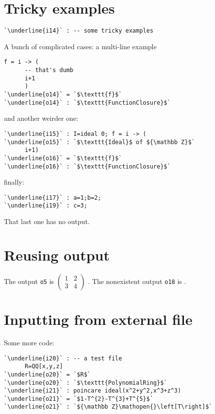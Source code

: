 \documentclass[12pt,a4paper]{amsart}
\begin{document}
\section{Tricky examples}
\begin{lstlisting}[language=Macaulay2]
`\underline{i14}` : -- some tricky examples\end{lstlisting}
A bunch of complicated cases: a multi-line example
\begin{lstlisting}[language=Macaulay2]
      f = i -> (
      -- that's dumb
      i+1
      )
`\underline{o14}` = `$\texttt{f}$`
`\underline{o14}` : `$\texttt{FunctionClosure}$`\end{lstlisting}
and another weirder one:
\begin{lstlisting}[language=Macaulay2]
`\underline{i15}` : I=ideal 0; f = i -> (
`\underline{o15}` : `$\texttt{Ideal}$ of ${\mathbb Z}$`
      i+1)
`\underline{o16}` = `$\texttt{f}$`
`\underline{o16}` : `$\texttt{FunctionClosure}$`\end{lstlisting}
finally:
\begin{lstlisting}[language=Macaulay2]
`\underline{i17}` : a=1;b=2;
`\underline{i19}` : c=3;\end{lstlisting}
That last one has no output.

\section{Reusing output}
\newcommand\macoutput[1]{{\tt [Macaulay2 output o#1]}}%
The output {\tt o5} is $\left(\!\begin{array}{cc}
1&2\\
3&4
\end{array}\!\right)$%
.
The nonexistent output {\tt o18} is %
.

\section{Inputting from external file}
Some more code:
\begin{lstlisting}[language=Macaulay2]
`\underline{i20}` : -- a test file
      R=QQ[x,y,z]
`\underline{o20}` = `$R$`
`\underline{o20}` : `$\texttt{PolynomialRing}$`
`\underline{i21}` : poincare ideal(x^2+y^2,x^3+z^3)
`\underline{o21}` = `$1-T^{2}-T^{3}+T^{5}$`
`\underline{o21}` : `${\mathbb Z}\mathopen{}\left[T\right]$`\end{lstlisting}
\end{document}
